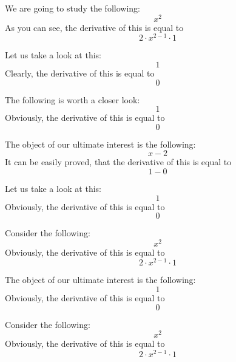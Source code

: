 \documentclass{article}
\begin{document}
We are going to study the following:
\begin{equation}
x ^{2 } 
\end{equation}
As you can see, the derivative of this is equal to
\begin{equation}
2 \cdot x ^{2 - 1 } \cdot 1 
\end{equation}

Let us take a look at this:
\begin{equation}
1 
\end{equation}
Clearly, the derivative of this is equal to
\begin{equation}
0 
\end{equation}

The following is worth a closer look:
\begin{equation}
1 
\end{equation}
Obviously, the derivative of this is equal to
\begin{equation}
0 
\end{equation}

The object of our ultimate interest is the following:
\begin{equation}
x - 2 
\end{equation}
It can be easily proved, that the derivative of this is equal to
\begin{equation}
1 - 0 
\end{equation}

Let us take a look at this:
\begin{equation}
1 
\end{equation}
Obviously, the derivative of this is equal to
\begin{equation}
0 
\end{equation}

Consider the following:
\begin{equation}
x ^{2 } 
\end{equation}
Obviously, the derivative of this is equal to
\begin{equation}
2 \cdot x ^{2 - 1 } \cdot 1 
\end{equation}

The object of our ultimate interest is the following:
\begin{equation}
1 
\end{equation}
Obviously, the derivative of this is equal to
\begin{equation}
0 
\end{equation}

Consider the following:
\begin{equation}
x ^{2 } 
\end{equation}
Obviously, the derivative of this is equal to
\begin{equation}
2 \cdot x ^{2 - 1 } \cdot 1 
\end{equation}
\end{document}
